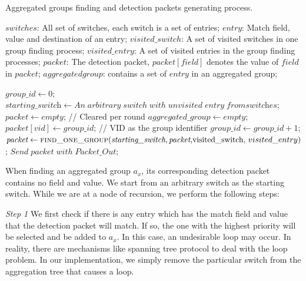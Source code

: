 \documentclass[conference]{IEEEtran}
\begin{document}
\label{pseudo}
\begin{algorithm}[ht]

  \caption{Aggregated groups finding and detection packets generating process.}
  \begin{algorithmic}[1]
    \Require
      $switches$: All set of switches, each switch is a set of entries;  \newline
      $entry$: Match field, value and destination of an entry;  \newline
      $visited\_switch$: A set of visited switches in one group finding process;  \newline
      $visited\_entry$: A set of visited entries in the group finding processes; \newline
      $packet$: The detection packet, $packet[field]$ denotes the value of $field$ in $packet$; \newline
      $aggregated group$: contains a set of $entry$ in an aggregated group; \newline
      
      \State $\textit{group\_id} \gets 0$;
            \State $\textit{starting\_switch} \gets An\;arbitrary\;switch\;with\;unvisited\;entry\;from\textit{switches}$;
            \State $\textit{packet} \gets empty$;   // Cleared per round
            \State $\textit{aggregated\_group} \gets empty$;
            \State $packet[vid] \gets \textit{group\_id}$;   // VID as the group identifier 
            \State $group\_id \gets \textit{group\_id} + 1$;
            \State $\textit{packet} \gets \Call{find\_one\_group}{\textit{starting\_switch}, \textit{packet}, $visited\_switch, $visited\_entry}$;
            \State $Send\;\textit{packet}\;with\;Packet\_Out$;
      \EndWhile
    \EndFunction
  \end{algorithmic}
\end{algorithm}

When finding an aggregated group $a_x$, its corresponding detection packet contains no field and value. We start from an arbitrary switch as the starting switch. While we are at a node of recursion, we perform the following steps:

\textit{Step 1} We first check if there is any entry which has the match field and value that the detection packet will match. If so, the one with the highest priority will be selected and be added to $a_x$. In this case, an undesirable loop may occur. In reality, there are mechanisms like spanning tree protocol to deal with the loop problem. In our implementation, we simply remove the particular switch from the aggregation tree that causes a loop. 
\end{document}
